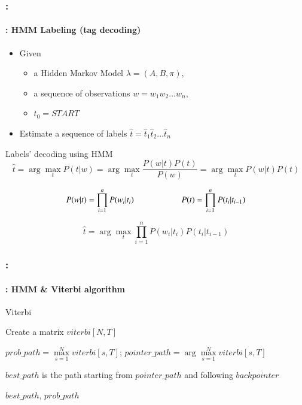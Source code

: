 \documentclass[xcolor=table]{beamer}
\begin{document}
\begin{frame}
	\frametitle{\insertshortsubtitle: \insertsection}
	\framesubtitle{\insertsubsection: HMM Labeling (tag decoding)}
	
	\begin{itemize}
			\item Given
			\begin{itemize}
				\item a Hidden Markov Model $\lambda = (A, B, \pi)$,
				\item a sequence of observations $w = w_1 w_2 \ldots w_n$,
				\item $t_0 = START$
			\end{itemize}
			\item Estimate a sequence of labels $\hat{t} = \hat{t}_1 \hat{t}_2 \ldots \hat{t}_n$
		\end{itemize}
	
	\begin{block}{Labels' decoding using HMM}
			\[
			\hat{t} = \arg\max\limits_t P(t | w) = \arg\max\limits_t \frac{P(w|t) P(t)}{P(w)} = \arg\max\limits_t P(w|t) P(t)%
			\]
			
			\[ 
			P(w | t) = \prod\limits_{i=1}^n P(w_i|t_i) 
			\hskip2cm
			P(t) = \prod\limits_{i=1}^n P(t_i|t_{i-1}) 
			\]
			
			\[
			\hat{t} = \arg\max\limits_t \prod\limits_{i=1}^n P(w_i|t_i) P(t_i|t_{i-1})
			\]
		\end{block}
\end{frame}

\begin{frame}
	\frametitle{\insertshortsubtitle: \insertsection}
	\framesubtitle{\insertsubsection: HMM \& Viterbi algorithm}
	
	\begin{block}{Viterbi}
			\scriptsize
			\begin{algorithm}[H]
					
					Create a matrix $viterbi[N, T]$\;
					
					
					
					$prob\_path = \max\limits_{s=1}^N viterbi[s, T];\, pointer\_path = \arg\max\limits_{s=1}^N viterbi[s, T]$\;
					
					$best\_path$ is the path starting from $pointer\_path$ and following $backpointer$
					
					\Return $best\_path$, $prob\_path$\;
					
				\end{algorithm}
		\end{block}
	
\end{frame}
\end{document}
